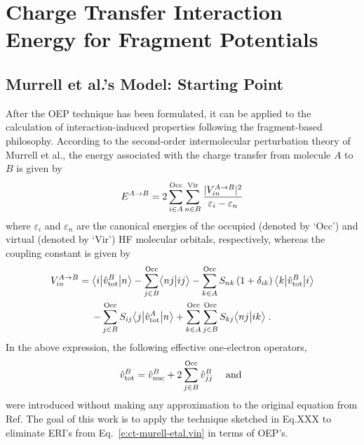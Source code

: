 \section{\label{s:34r}Charge Transfer Interaction Energy for Fragment Potentials}

\subsection{\label{s:34rg} Murrell et al.'s Model: Starting Point}

After the OEP technique has been formulated, it can be applied 
to the calculation of interaction\hyp{}induced properties following the
fragment\hyp{}based philosophy. 
According to the second\hyp{}order intermolecular perturbation theory of Murrell et al.,
the energy associated with the charge transfer from molecule $A$ to $B$ is given by
%
\begin{equation} \label{e:ct-murell-etal.e}
 E^{A\rightarrow B} = 2 \sum_{i\in A}^{\rm Occ} \sum_{n\in B}^{\rm Vir} 
  \frac{\vert V^{A\rightarrow B}_{in} \vert^2 }{\varepsilon_i - \varepsilon_n}
\end{equation}
%
%
where $\varepsilon_i$ and $\varepsilon_n$ are the canonical energies
of the occupied (denoted by `Occ') and virtual (denoted by `Vir') 
HF molecular orbitals, respectively,
whereas the coupling constant is given by
%
\begin{multline} \label{e:ct-murell-etal.vin}
 V^{A\rightarrow B}_{in} = 
        \bigl\langle {i} \bigl\lvert {\hat{v}^B_{\rm tot} } \bigl\lvert {n} \bigr\rangle 
      - \sum_{j\in B}^{\rm Occ} \bigl\langle {nj} \bigl\lvert {ij} \bigr\rangle 
      - \sum_{k\in A}^{\rm Occ} S_{nk} \left(1+\delta_{ik}\right) \bigl\langle {k} \bigl\lvert {\hat{v}^B_{\rm tot} } \bigl\lvert {i} \bigr\rangle \\
      - \sum_{j\in B}^{\rm Occ} S_{ij} \bigl\langle {j} \bigl\lvert {\hat{v}^A_{\rm tot} } \bigl\lvert {n} \bigr\rangle  
     + \sum_{k\in A}^{\rm Occ} \sum_{j\in B}^{\rm Occ}  
        S_{kj} \bigl\langle {nj} \bigl\lvert {ik} \bigr\rangle \;.
\end{multline}
%
In the above expression, the following effective one\hyp{}electron operators,
%
\begin{subequations} 
\begin{align} \label{e:ct-murell-etal.vtot-vi}
 \hat{v}^B_{\rm tot} &= \hat{v}^B_{\rm nuc} + 2\sum_{j\in B}^{\rm Occ} \hat{v}^B_{jj} \quad\text{ and }\\ 
\end{align}
\end{subequations}
%
were introduced without making any approximation to the original equation
from Ref. 
The goal of this work is to apply the technique sketched in Eq.XXX
to eliminate ERI's from Eq.~\eqref{e:ct-murell-etal.vin} in terms of OEP's.

